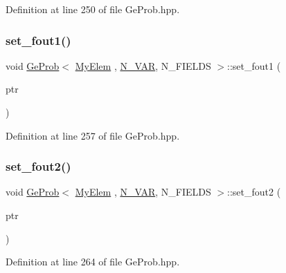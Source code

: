 Definition at line 250 of file Ge\+Prob.\+hpp.

\mbox{\label{classGeProb_a75433e7f3aec6d8f0746cd3e0e82db96}} 
\subsubsection{\texorpdfstring{set\+\_\+fout1()}{set\_fout1()}}
{\footnotesize\ttfamily void \hyperlink{classGeProb}{Ge\+Prob}$<$ \hyperlink{DG__Prob_8h_a83cd887ced9a6587428f267e50cd4787}{My\+Elem} , \hyperlink{classED__Prob_a4e7d2ff1a8e435e336fb00c527224b5a}{N\+\_\+\+V\+AR}, N\+\_\+\+F\+I\+E\+L\+DS $>$\+::set\+\_\+fout1 (\begin{DoxyParamCaption}\item[{F\+I\+LE $\ast$}]{ptr }\end{DoxyParamCaption})\hspace{0.3cm}{\ttfamily [inherited]}}



Definition at line 257 of file Ge\+Prob.\+hpp.

\mbox{\label{classGeProb_a18762ac0ce4ba659b15e97a5521bc456}} 
\subsubsection{\texorpdfstring{set\+\_\+fout2()}{set\_fout2()}}
{\footnotesize\ttfamily void \hyperlink{classGeProb}{Ge\+Prob}$<$ \hyperlink{DG__Prob_8h_a83cd887ced9a6587428f267e50cd4787}{My\+Elem} , \hyperlink{classED__Prob_a4e7d2ff1a8e435e336fb00c527224b5a}{N\+\_\+\+V\+AR}, N\+\_\+\+F\+I\+E\+L\+DS $>$\+::set\+\_\+fout2 (\begin{DoxyParamCaption}\item[{F\+I\+LE $\ast$}]{ptr }\end{DoxyParamCaption})\hspace{0.3cm}{\ttfamily [inherited]}}



Definition at line 264 of file Ge\+Prob.\+hpp.

\mbox{\label{classGeProb_a2fa255c26250f6ee540b910949f530ed}} 
